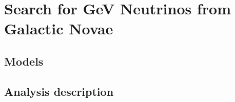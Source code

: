 \chapter{Search for GeV Neutrinos from Galactic Novae}
\label{sec:Novae}



\section{Models}
\label{sec:Novae:models}


\section{Analysis description}
\label{sec:Novae:analysis}